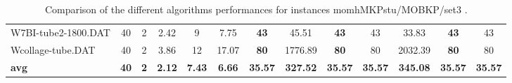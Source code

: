 \begin{table}[h]
{\begin{tabular}{lcccccccccccc}
W7BI-tube2-1800.DAT & 40 & 2 &  \textcolor{blue2}{2.42} & 9 & 7.75 &  \textbf{43} & 45.51 &  \textbf{43} & 43 & 33.83 &  \textbf{43} & 43 \\
Wcollage-tube.DAT & 40 & 2 &  \textcolor{blue2}{3.86} & 12 & 17.07 &  \textbf{80} & 1776.89 &  \textbf{80} & 80 & 2032.39 &  \textbf{80} & 80 \\
\cline{1-13} \textbf{avg} & \textbf{40} & \textbf{2} & \textbf{2.12} & \textbf{7.43} & \textbf{6.66} & \textbf{35.57} & \textbf{327.52} & \textbf{35.57} & \textbf{35.57} & \textbf{345.08} & \textbf{35.57} & \textbf{35.57} \\ \cline{1-13}
\bottomrule
\end{tabular}
}%
\caption{Comparison of the different algorithms performances for instances momhMKPstu/MOBKP/set3 .}
\label{tab:table_compare_momhMKPstu/MOBKP/set3 }
\end{table}
